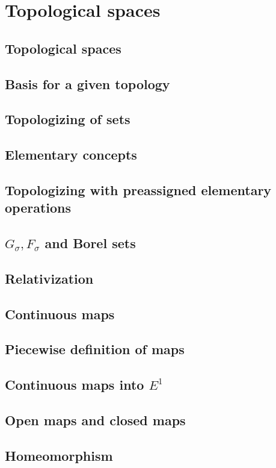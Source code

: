 \chapter{Topological spaces}

\section{Topological spaces}

\section{Basis for a given topology}

\section{Topologizing of sets}

\section{Elementary concepts}

\section{Topologizing with preassigned elementary operations}

\section{\( G_{\sigma}, F_{\sigma} \) and Borel sets}

\section{Relativization}

\section{Continuous maps}

\section{Piecewise definition of maps}

\section{Continuous maps into \( E^{1} \)}

\section{Open maps and closed maps}

\section{Homeomorphism}

